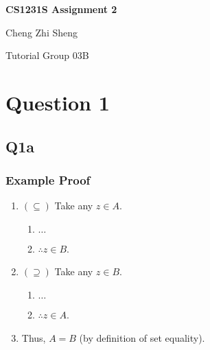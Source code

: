 \documentclass[12pt]{article}
\begin{document}
\begin{center}
    \huge
    \textbf{CS1231S Assignment 2}

    \vspace{0.5cm}
    Cheng Zhi Sheng
       
    \vspace{0.5cm}
    Tutorial Group 03B

    \vspace{0.5cm}
\end{center}

    
\section*{Question 1}
\subsection*{Q1a}
\subsubsection*{Example Proof}
\begin{enumerate}
    \item $(\subseteq)$ Take any $z \in A$.
    \begin{enumerate}
        \item $\dots$
        \item $\therefore z \in B$.
    \end{enumerate}

    \item $(\supseteq)$ Take any $z \in B$.
    \begin{enumerate}
        \item $\dots$
        \item $\therefore z \in A$.
    \end{enumerate}

    \item Thus, $A=B$ (by definition of set equality).
\end{enumerate}
\end{document}
